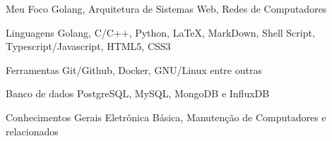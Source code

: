 
\begin{cvskills}
  \cvskill
  {Meu Foco}
  {Golang, Arquitetura de Sistemas Web, Redes de Computadores}

  \cvskill
  {Linguagens}
  { Golang, C/C++, Python, LaTeX, MarkDown, Shell Script, Typescript/Javascript, HTML5, CSS3}

  \cvskill
  {Ferramentas}
  {Git/Github, Docker, GNU/Linux entre outras }

  \cvskill
  {Banco de dados}
  {PostgreSQL, MySQL, MongoDB e InfluxDB}

  \cvskill
  {Conhecimentos Gerais}
  {Eletrônica Básica, Manutenção de Computadores e relacionados}

\end{cvskills}
